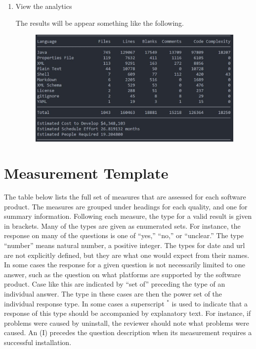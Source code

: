 \documentclass[letterpaper,cleveref]{lipics-v2019}
\begin{document}
\begin{enumerate}
\item View the analytics

The results will be appear something like the following.

\begin{figure}[h!]
\includegraphics[scale=0.5]{scc-demo.JPG}
\end{figure}

\end{enumerate}

\newpage

\section{Measurement Template} \label{SecGradingTemplate}

The table below lists the full set of measures that are assessed for each
software product.  The measures are grouped under headings for each quality, and
one for summary information.  Following each measure, the type for a valid
result is given in brackets.  Many of the types are given as enumerated sets.
For instance, the response on many of the questions is one of ``yes,'' ``no,''
or ``unclear.''  The type ``number'' means natural number, a positive integer.  The
types for date and url are not explicitly defined, but they are what one would
expect from their names.  In some cases the response for a given question is not
necessarily limited to one answer, such as the question on what platforms are
supported by the software product.  Case like this are indicated by ``set of''
preceding the type of an individual answer.  The type in these cases are then
the power set of the individual response type.  In some cases a superscript $^*$
is used to indicate that a response of this type should be accompanied by
explanatory text.  For instance, if problems were caused by uninstall, the
reviewer should note what problems were caused.  An (I) precedes the question
description when its measurement requires a successful installation.
\end{document}
